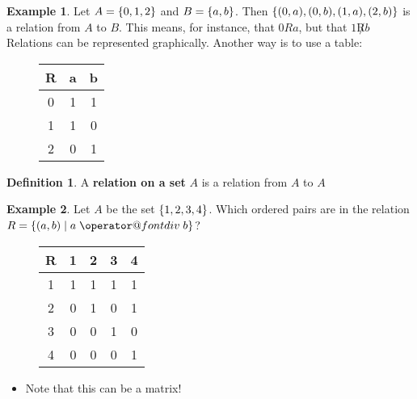 \documentclass[article, 12pt]{article}
\makeatletter
\theoremstyle{definition}
\newtheorem{example}{Example}[subsection]
\newtheorem{definition}{Definition}[subsection]
\DeclarePairedDelimiter\set{\{}{\}}
\newcommand*{\bdiv}{%
  \nonscript\mskip-\medmuskip\mkern5mu%
  \mathbin{\operator@font div}\penalty900\mkern5mu%
  \nonscript\mskip-\medmuskip
}
\makeatother
\begin{document}
    \begin{example}
        Let $A = \set*{0,1,2}$ and $B=\set*{a,b}$. Then $\set*{(0,a),(0,b),(1,a),(2,b)}$ is a relation from $A$ to $B$. This means, for instance, that $0Ra$, but that $1 \not R b$ Relations can be represented graphically. Another way is to use a table:
        \begin{figure}
            \centering
            \begin{tikzpicture}

            \end{tikzpicture}
        \end{figure}
        \begin{figure}[H]
            \centering
            \begin{tabular}{c|c c}
                R & a & b \\
                \hline
                0 & 1 & 1 \\
                1 & 1 & 0 \\
                2 & 0 & 1 \\
            \end{tabular}
        \end{figure}
    \end{example}
    \begin{definition}
        A \textbf{relation on a set} $A$ is a relation from $A$ to $A$
    \end{definition}
    \begin{example}
        Let $A$ be the set $\set*{1,2,3,4}$. Which ordered pairs are in the relation $R = \set*{(a,b) \mid a \bdiv b}$?
        \begin{figure}[H]
            \centering
            \begin{tabular}{c|c c c c}
                R & 1 & 2 & 3 & 4 \\
                \hline
                1 & 1 & 1 & 1 & 1 \\
                2 & 0 & 1 & 0 & 1 \\
                3 & 0 & 0 & 1 & 0 \\
                4 & 0 & 0 & 0 & 1 \\
            \end{tabular}
            \label{fig:example 1.1.2}
        \end{figure}
        \begin{itemize}
            \item Note that this can be a matrix!
        \end{itemize}
    \end{example}
\end{document}

